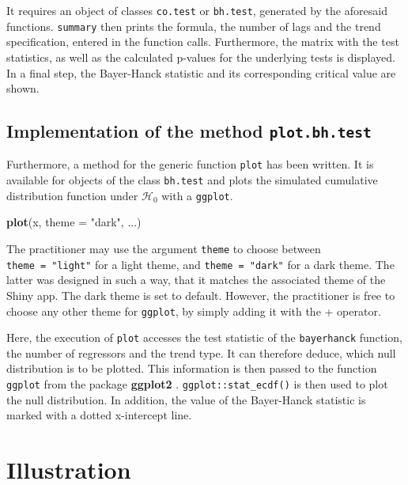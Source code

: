 \documentclass[12pt,a4paper]{article}
\newenvironment{Shaded}{\begin{snugshade}}{\end{snugshade}}
\newcommand{\DataTypeTok}[1]{\textcolor[rgb]{0.13,0.29,0.53}{#1}}
\newcommand{\KeywordTok}[1]{\textcolor[rgb]{0.13,0.29,0.53}{\textbf{#1}}}
\newcommand{\NormalTok}[1]{#1}
\newcommand{\StringTok}[1]{\textcolor[rgb]{0.31,0.60,0.02}{#1}}
\begin{document}
It requires an object of classes \texttt{co.test} or \texttt{bh.test},
generated by the aforesaid functions. \texttt{summary} then prints the
formula, the number of lags and the trend specification, entered in the
function calls. Furthermore, the matrix with the test statistics, as
well as the calculated p-values for the underlying tests is displayed.
In a final step, the Bayer-Hanck statistic and its corresponding
critical value are shown.

\hypertarget{implementation-of-the-method-plot.bh.test}{%
\subsection{\texorpdfstring{Implementation of the method
\texttt{plot.bh.test}}{Implementation of the method plot.bh.test}}\label{implementation-of-the-method-plot.bh.test}}

Furthermore, a method for the generic function \texttt{plot} has been
written. It is available for objects of the class \texttt{bh.test} and
plots the simulated cumulative distribution function under
\(\mathcal{H}_0\) with a \texttt{ggplot}.

\begin{Shaded}
\begin{Highlighting}[]
\KeywordTok{plot}\NormalTok{(x, }\DataTypeTok{theme =} \StringTok{"dark"}\NormalTok{, ...)}
\end{Highlighting}
\end{Shaded}

The practitioner may use the argument \texttt{theme} to choose between
\texttt{theme\ =\ "light"} for a light theme, and
\texttt{theme\ =\ "dark"} for a dark theme. The latter was designed in
such a way, that it matches the associated theme of the Shiny app. The
dark theme is set to default. However, the practitioner is free to
choose any other theme for \texttt{ggplot}, by simply adding it with the
+ operator.

Here, the execution of \texttt{plot} accesses the test statistic of the
\texttt{bayerhanck} function, the number of regressors and the trend
type. It can therefore deduce, which null distribution is to be plotted.
This information is then passed to the function \texttt{ggplot} from the
package \textbf{ggplot2} \autocite{wickham_ggplot2_2020}.
\texttt{ggplot::stat\_ecdf()} is then used to plot the null
distribution. In addition, the value of the Bayer-Hanck statistic is
marked with a dotted x-intercept line.

\hypertarget{illustration}{%
\section{Illustration}\label{illustration}}
\end{document}
